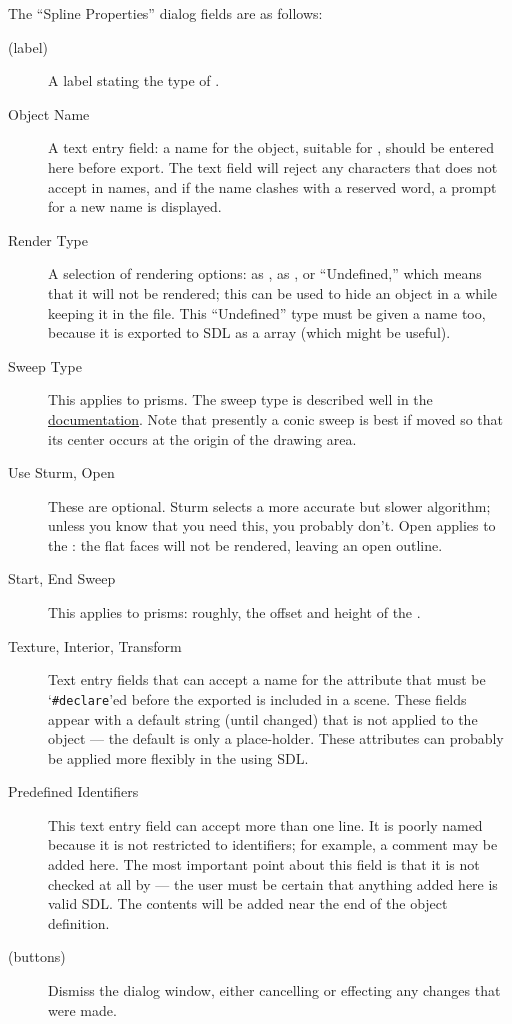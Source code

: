 		The ``Spline Properties'' dialog fields are as follows:
		\begin{description}
		  \item[(label)] A label stating the type of \IXspline{}.
		  \item[Object Name] A text entry field: a name
			for the object, suitable for \IXpov{} ,
			should be entered here before export. The text
			field will reject any characters that \IXpov{}
			does not accept in names, and if the name clashes
			with a \IXpov{} reserved word, a prompt for a
			new name is displayed.
		  \item[Render Type] A selection of rendering options:
			as \IXlathe{}, as \IXprism{}, or ``Undefined,''
			which means that it will not
			be rendered; this can be used to hide an object in
			a \IXpov{}  while keeping it in the
			\IXpkg{} file. This ``Undefined'' type must be given
			a name too, because it is exported to SDL as a \IXpov{}
			array (which might be useful).
		  \item[Sweep Type] This applies to prisms. The sweep
			type is described well in the \IXpov{}
			\href{\URLPOVdocsPrism}{\IXprism{} documentation}.
			Note that presently a conic sweep \IXprism{} is best
			if moved so that its center occurs at the origin
			of the \IXpkg{} drawing area.
		  \item[Use Sturm, Open] These are optional. Sturm selects
			a more accurate but slower algorithm; unless you
			know that you need this, you probably don't.
			Open applies to the \IXprism{}: the flat faces will not
			be rendered, leaving an open outline.
		  \item[Start, End Sweep] This applies to prisms:
			roughly, the offset and height of the \IXprism{}.
		  \item[Texture, Interior, Transform] Text entry
			fields that can accept a name for the attribute
			that must be
			`\verb!#declare!'ed
			before the exported  is included
			in a scene. These fields appear with a default
			string (until changed) that is not applied to
			the object --- the default is only a place-holder.
			These attributes can probably be applied more
			flexibly in the using SDL.				
		  \item[Predefined Identifiers] This text entry field
			can accept more than one line. It is poorly named
			because it is not restricted to identifiers;
			for example, a comment may be added here.
			The most important point about this field is
			that it is not checked at all by \IXpkg{} ---
			the user must be certain that anything added here
			is valid SDL. The contents will be added near the
			end of the object definition.
		  \item[(buttons)] Dismiss the dialog window, either
			cancelling or effecting any changes that were made.
		\end{description}

